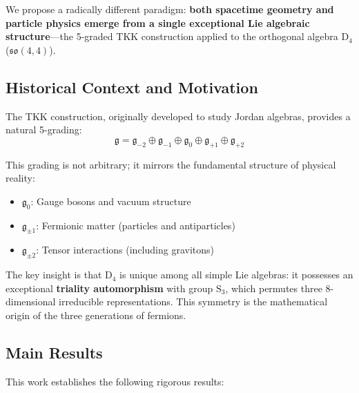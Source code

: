 \documentclass[12pt,a4paper]{article}
\theoremstyle{definition}
\theoremstyle{axiom}
\newcommand{\g}{\mathfrak{g}}
\newcommand{\so}{\mathfrak{so}}
\begin{document}
We propose a radically different paradigm: \textbf{both spacetime geometry and particle physics emerge from a single exceptional Lie algebraic structure}---the 5-graded TKK construction applied to the orthogonal algebra D$_4$ ($\so(4,4)$).

\subsection{Historical Context and Motivation}

The TKK construction, originally developed to study Jordan algebras, provides a natural 5-grading:
\begin{equation}
\g = \g_{-2} \oplus \g_{-1} \oplus \g_0 \oplus \g_{+1} \oplus \g_{+2}
\end{equation}

This grading is not arbitrary; it mirrors the fundamental structure of physical reality:
\begin{itemize}
\item $\g_0$: Gauge bosons and vacuum structure
\item $\g_{\pm 1}$: Fermionic matter (particles and antiparticles)
\item $\g_{\pm 2}$: Tensor interactions (including gravitons)
\end{itemize}

The key insight is that D$_4$ is unique among all simple Lie algebras: it possesses an exceptional \textbf{triality automorphism} with group $\mathrm{S}_3$, which permutes three 8-dimensional irreducible representations. This symmetry is the mathematical origin of the three generations of fermions.

\subsection{Main Results}

This work establishes the following rigorous results:
\end{document}
